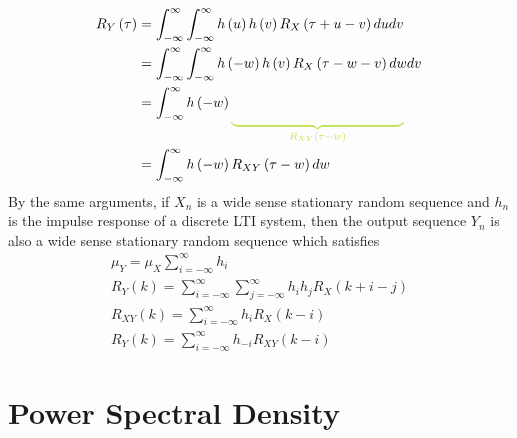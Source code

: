 \documentclass[11pt]{report} %
\begin{document}
\begin{align}
R_{Y}\left(\tau\right) &= \int_{-\infty}^{\infty}\int_{-\infty}^{\infty}h\left(u\right)h\left(v\right)R_{X}\left(\tau+u-v\right)dudv \\
&= \int_{-\infty}^{\infty}\int_{-\infty}^{\infty}h\left(-w\right)h\left(v\right)R_{X}\left(\tau-w-v\right)dwdv \\
&= \int_{-\infty}^{\infty}h\left(-w\right)\green\underbrace{\black\int_{-\infty}^{\infty}h\left(v\right)R_{X}\left(\tau-w-v\right)dv}_{\green R_{XY}\left(\tau-w\right)}\black dw \\
&= \int_{-\infty}^{\infty}h\left(-w\right)R_{XY}\left(\tau-w\right)dw
\end{align}
By the same arguments, if $X_{n}$ is a wide sense stationary random sequence and $h_{n}$ is the impulse response of a discrete LTI system, then the output sequence $Y_{n}$ is also a wide sense stationary random sequence which satisfies
\begin{gather}
\mu_{Y} = \mu_{X}\sum_{i = -\infty}^{\infty}h_{i} \\
R_{Y}\left(k\right) = \sum_{i = -\infty}^{\infty}\sum_{j = -\infty}^{\infty}h_{i}h_{j}R_{X}\left(k + i - j\right) \\
R_{XY}\left(k\right) = \sum_{i = -\infty}^{\infty}h_{i}R_{X}\left(k - i\right) \\
R_{Y}\left(k\right) = \sum_{i = -\infty}^{\infty}h_{-i}R_{XY}\left(k - i\right)
\end{gather}

\section{Power Spectral Density}
\end{document}
